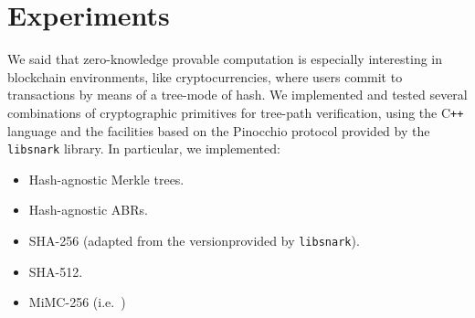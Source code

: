 \section{Experiments}\label{sec:experiments}
We said that zero-knowledge provable computation is especially interesting in blockchain
environments, like cryptocurrencies, where users commit to transactions by means of a tree-mode of
hash.
We implemented and tested several combinations of cryptographic primitives for tree-path
verification, using the C\texttt{++} language and the facilities based on the Pinocchio protocol 
provided by the \texttt{libsnark} library.
In particular, we implemented:
\begin{itemize}
  \item Hash-agnostic Merkle trees.
  \item Hash-agnostic ABRs.
  \item SHA-256 (adapted from the versionprovided by \texttt{libsnark}).
  \item SHA-512.
  \item MiMC-256 (i.e.\ )
\end{itemize}

